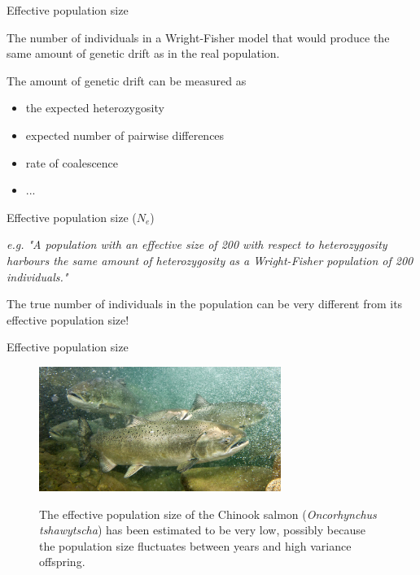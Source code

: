 \begin{frame}{Effective population size}

	\begin{block}{}
		The number of individuals in a Wright-Fisher model that would produce the same amount of
		genetic drift as in the real population.
	\end{block}

	The amount of genetic drift can be measured as
	\begin{itemize}
		\item the expected heterozygosity
		\item expected number of pairwise differences
		\item rate of coalescence
		\item ...
	\end{itemize}

\end{frame}


\begin{frame}{Effective population size ($N_e$)}

	\textit{e.g. "A population with an effective size of 200 with respect to heterozygosity harbours
	the same amount of heterozygosity as a Wright-Fisher population of 200 individuals."}

	\bigskip

	The true number of individuals in the population can be very different from its effective
	population size!

\end{frame}


\begin{frame}{Effective population size}

	\begin{figure}
        	\includegraphics[width=0.7\textwidth]{Pics/salmon} \\
		\caption{The effective population size of the Chinook salmon (\textit{Oncorhynchus tshawytscha}) 
	  	has been estimated to be very low, possibly because the population size fluctuates between years and high variance
	  	offspring.} 
        \end{figure}

\end{frame}


